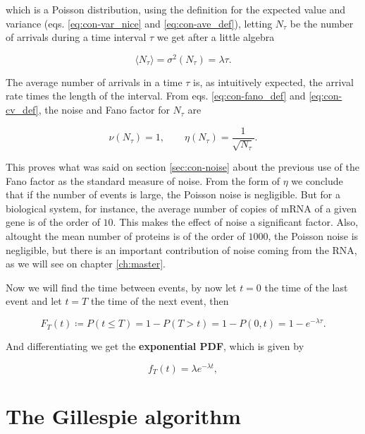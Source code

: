 which is a Poisson distribution, using the definition for the expected value and variance (eqs. \eqref{eq:con-var_nice} and \eqref{eq:con-ave_def}), letting $N_\tau$ be the number of arrivals during a time interval $\tau$  we get after a little algebra

\begin{equation*}
  \langle N_\tau\rangle = \sigma^2(N_\tau) = \lambda \tau.
\end{equation*}

The average number of arrivals in a time $\tau$ is, as intuitively expected, the arrival rate times the length of the interval. From eqs. \eqref{eq:con-fano_def} and \eqref{eq:con-cv_def}, the noise and Fano factor for $N_\tau$ are

\begin{equation*}
  \nu(N_\tau) = 1,\quad\quad \eta(N_\tau) = \frac{1}{\sqrt{N_\tau}}.
\end{equation*}

This proves what was said on section \ref{sec:con-noise} about the previous use of the Fano factor as the standard measure of noise. From the form of $\eta$ we conclude that if the number of events is large, the Poisson noise is negligible. But for a biological system, for instance, the average number of copies of mRNA of a given gene is of the order of $10$. This makes the effect of noise a significant factor. Also, altought the mean number of proteins is of the order of $1000$, the Poisson noise is negligible, but there is an important contribution of noise coming from the RNA, as we will see on chapter \ref{ch:master}.

Now we will find the time between events, by now let $t=0$ the time of the last event and let $t=T$ the time of the next event, then

\begin{equation*}
  F_T(t) \coloneqq P(t\leq T) = 1-P(T>t) = 1 - P(0,t) = 1 - e^{-\lambda\tau}.
\end{equation*}

And differentiating we get the \textbf{exponential PDF}, which is given by

\begin{equation*}
  f_T(t) = \lambda e^{-\lambda t},
\end{equation*}

\section{The Gillespie algorithm}

